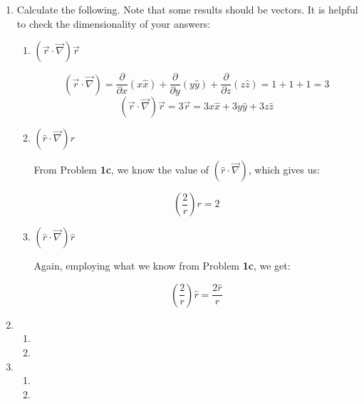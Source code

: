 \begin{enumerate}
\begin{enumerate}
\begin{itemize}
        \end{itemize}

    \end{enumerate}

  \item Calculate the following. Note that some results should be vectors.  It is helpful to check the dimensionality of your answers:

    \begin{enumerate}

      \item $(\vec{r}\cdot\vec{\nabla})\vec{r}$

        $$(\vec{r}\cdot\vec{\nabla})=\frac{\partial}{\partial x}(x\hat{x})+\frac{\partial}{\partial y} (y\hat{y})+\frac{\partial}{\partial z}(z\hat{z})=1+1+1=3$$
        $$\boxed{(\vec{r}\cdot\vec{\nabla})\vec{r}=3\vec{r}=3x\hat{x}+3y\hat{y}+3z\hat{z}}$$

      \item $(\hat{r}\cdot\vec{\nabla})r$

        From Problem \textbf{1c}, we know the value of $(\hat{r}\cdot\vec{\nabla})$, which gives us:

        $$\boxed{\left( \frac{2}{r} \right)r=2}$$

      \item $(\hat{r}\cdot\vec{\nabla})\hat{r}$

        Again, employing what we know from Problem \textbf{1c}, we get:

        $$\boxed{\left( \frac{2}{r} \right)\hat{r}=\frac{2\hat{r}}{r}}$$

    \end{enumerate}

  \item 

    \begin{enumerate}

      \item 

      \item 

    \end{enumerate}

  \item 

    \begin{enumerate}

      \item 

      \item 


\end{enumerate}
\end{enumerate}
